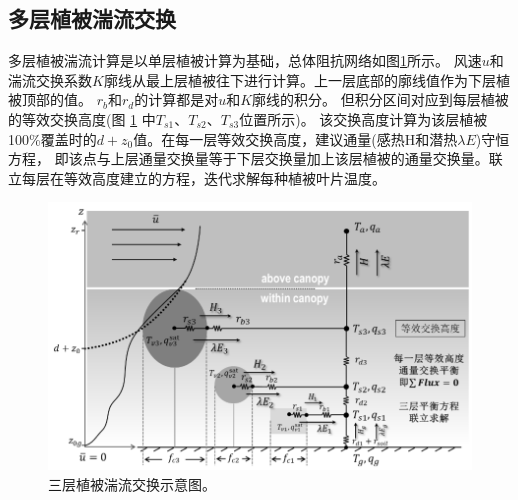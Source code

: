 \subsection{多层植被湍流交换}
多层植被湍流计算是以单层植被计算为基础，总体阻抗网络如图\ref{fig:三层植被湍流交换示意图}所示。
风速$u$和湍流交换系数$K$廓线从最上层植被往下进行计算。上一层底部的廓线值作为下层植被顶部的值。
$r_b$和$r_d$的计算都是对$u$和$K$廓线的积分。
但积分区间对应到每层植被的等效交换高度(图 \ref{fig:三层植被湍流交换示意图} 中$T_{s1}$、$T_{s2}$、$T_{s3}$位置所示)。
该交换高度计算为该层植被100\%覆盖时的$d+z_0$值。在每一层等效交换高度，建议通量(感热H和潜热$\lambda E$)守恒方程，
即该点与上层通量交换量等于下层交换量加上该层植被的通量交换量。联立每层在等效高度建立的方程，迭代求解每种植被叶片温度。
{
\begin{figure}[]
\centering
\includegraphics{Figures/地表湍流交换过程/三层植被湍流交换示意图.png}
\caption{三层植被湍流交换示意图。}
\label{fig:三层植被湍流交换示意图}
\end{figure}
}


